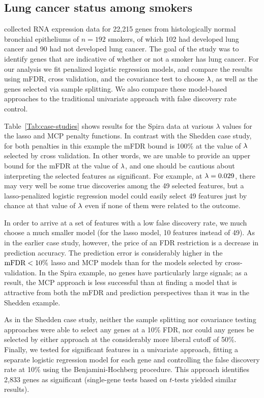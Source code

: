 \subsection{Lung cancer status among smokers}

\citet{Spira2007} collected RNA expression data for 22,215 genes from histologically normal bronchial epitheliums of $n = 192$ smokers, of which 102 had developed lung cancer and 90 had not developed lung cancer.
The goal of the study was to identify genes that are indicative of whether or not a smoker has lung cancer.  For our analysis we fit penalized logistic regression models, and compare the results using mFDR, cross validation, and the covariance test to choose $\lambda$, as well as the genes selected via sample splitting.   We also compare these model-based approaches to the traditional univariate approach with false discovery rate control.

Table~\ref{Tab:case-studies} shows results for the Spira data at various $\lambda$ values for the lasso and MCP penalty functions.  In contrast with the Shedden case study, for both penalties in this example the mFDR bound is 100\% at the value of $\lambda$ selected by cross validation.  In other words, we are unable to provide an upper bound for the mFDR at the value of $\lambda$, and one should be cautious about interpreting the selected features as significant.  For example, at $\lambda=0.029$, there may very well be some true discoveries among the 49 selected features, but a lasso-penalized logistic regression model could easily select 49 features just by chance at that value of $\lambda$ even if none of them were related to the outcome.

In order to arrive at a set of features with a low false discovery rate, we much choose a much smaller model (for the lasso model, 10 features instead of 49).  As in the earlier case study, however, the price of an FDR restriction is a decrease in prediction accuracy.  The prediction error is considerably higher in the $\textrm{mFDR} < 10\%$ lasso and MCP models than for the models selected by cross-validation.  In the Spira example, no genes have particularly large signals; as a result, the MCP approach is less successful than at finding a model that is attractive from both the mFDR and prediction perspectives than it was in the Shedden example.

As in the Shedden case study, neither the sample splitting nor covariance testing approaches were able to select any genes at a 10\% FDR, nor could any genes be selected by either approach at the considerably more liberal cutoff of 50\%.
Finally, we tested for significant features in a univariate approach, fitting a separate logistic regression model for each gene and controlling the false discovery rate at 10\% using the Benjamini-Hochberg procedure.
This approach identifies 2,833 genes as significant (single-gene tests based on $t$-tests yielded similar results).

